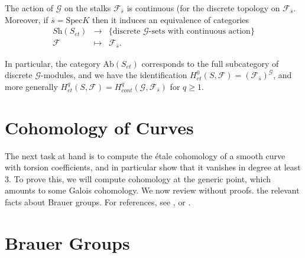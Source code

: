 \begin{theorem}
\label{theorem-equivalence-sheaves-point}
The action of $\mathcal{G}$ on the stalks $\mathcal{F}_{\bar s}$ is continuous
(for the discrete topology on $\mathcal{F}_{\bar s}$. Moreover, if $\bar s=
\text{Spec} K$ then it induces an equivalence of categories
$$
\begin{matrix}
\textit{Sh}(S_{et}) & \longrightarrow & \{ \text{discrete $\mathcal{G}$-sets
with continuous action} \} \\
\mathcal{F} & \longmapsto & \mathcal{F}_{\bar s}.
\end{matrix}
$$
\end{theorem}

\noindent
In particular, the category $\text{Ab}(S_{et})$ corresponds to the full
subcategory of discrete $\mathcal{G}$-modules, and we have the identification
$H_{et}^0(S,\mathcal{F}) = (\mathcal{F}_{\bar s})^\mathcal{G}$, and more
generally $H_{et}^q(S,\mathcal{F}) = H_{cont}^q (\mathcal{G}, \mathcal{F}_{\bar
s})$ for $q \geq 1$.





\section{Cohomology of Curves}
\label{section-cohomology-curves}

\noindent
The next task at hand is to compute the \'etale cohomology of a smooth curve
with torsion coefficients, and in particular show that it vanishes in degree at
least 3. To prove this, we will compute cohomology at the generic point, which
amounts to some Galois cohomology. We now review without proofs. the relevant
facts about Brauer groups. For references, see \cite{SerreCorpsLocaux},
\cite{SerreGaloisCohomology} or \cite{Weil}.




\section{Brauer Groups}
\label{section-brauer-groups}

